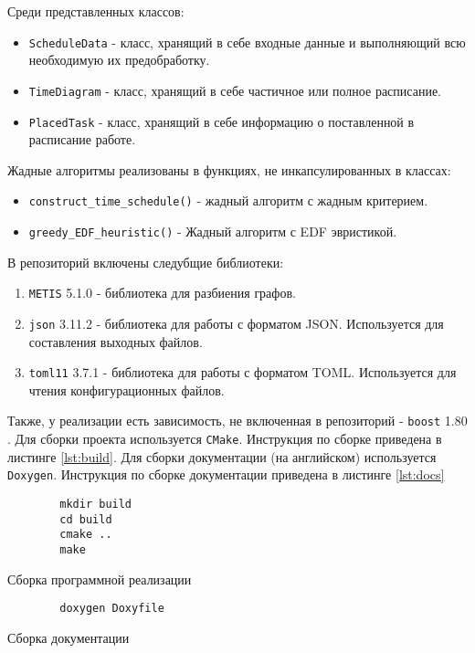 Среди представленных классов:
\begin{itemize}
    \item \texttt{ScheduleData} - класс, хранящий в себе входные данные и выполняющий всю необходимую их предобработку.
    \item \texttt{TimeDiagram} - класс, хранящий в себе частичное или полное расписание.
    \item \texttt{PlacedTask} - класс, хранящий в себе информацию о поставленной в расписание работе.
\end{itemize}

Жадные алгоритмы реализованы в функциях, не инкапсулированных в классах:
\begin{itemize}
    \item \texttt{construct\_time\_schedule()} - жадный алгоритм с жадным критерием.
    \item \texttt{greedy\_EDF\_heuristic()} - Жадный алгоритм с EDF эвристикой.
\end{itemize}

В репозиторий включены следубщие библиотеки:
\begin{enumerate}
    \item \texttt{METIS} 5.1.0 \cite{METIS_lib} - библиотека для разбиения графов.
    \item \texttt{json} 3.11.2 \cite{json_lib} - библиотека для работы с форматом JSON. Используется для составления выходных файлов.
    \item \texttt{toml11} 3.7.1 \cite{toml11_lib} - библиотека для работы с форматом TOML. Используется для чтения конфигурационных файлов.
\end{enumerate}

Также, у реализации есть зависимость, не включенная в репозиторий - \texttt{boost} 1.80 \cite{boost_framework}. Для сборки проекта используется \texttt{CMake}. Инструкция по сборке приведена в листинге \ref{lst:build}. Для сборки документации (на английском) используется \texttt{Doxygen}. Инструкция по сборке документации приведена в листинге \ref{lst:docs}

\begin{listing}[!htbp]
    \begin{verbatim}
        mkdir build
        cd build
        cmake ..
        make
    \end{verbatim}
    \caption{Сборка программной реализации}
    \label{lst:build}
\end{listing}

\begin{listing}[!htbp]
    \begin{verbatim}
        doxygen Doxyfile
    \end{verbatim}
    \caption{Сборка документации}
    \label{lst:docs}
\end{listing}


